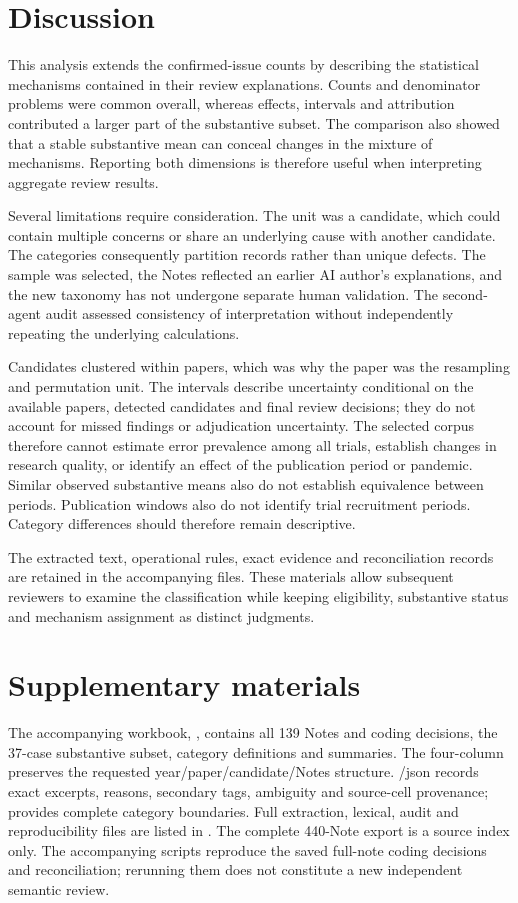 \documentclass[11pt,a4paper]{article}
\begin{document}
\section{Discussion}
This analysis extends the confirmed-issue counts by describing the statistical mechanisms contained in their review explanations. Counts and denominator problems were common overall, whereas effects, intervals and attribution contributed a larger part of the substantive subset. The comparison also showed that a stable substantive mean can conceal changes in the mixture of mechanisms. Reporting both dimensions is therefore useful when interpreting aggregate review results.\par
Several limitations require consideration. The unit was a candidate, which could contain multiple concerns or share an underlying cause with another candidate. The categories consequently partition records rather than unique defects. The sample was selected, the Notes reflected an earlier AI author's explanations, and the new taxonomy has not undergone separate human validation. The second-agent audit assessed consistency of interpretation without independently repeating the underlying calculations.\par
Candidates clustered within papers, which was why the paper was the resampling and permutation unit. The intervals describe uncertainty conditional on the available papers, detected candidates and final review decisions; they do not account for missed findings or adjudication uncertainty. The selected corpus therefore cannot estimate error prevalence among all trials, establish changes in research quality, or identify an effect of the publication period or pandemic. Similar observed substantive means also do not establish equivalence between periods. Publication windows also do not identify trial recruitment periods. Category differences should therefore remain descriptive.\par
The extracted text, operational rules, exact evidence and reconciliation records are retained in the accompanying files. These materials allow subsequent reviewers to examine the classification while keeping eligibility, substantive status and mechanism assignment as distinct judgments.\par
\section*{Supplementary materials}
The accompanying workbook, , contains all 139 Notes and coding decisions, the 37-case substantive subset, category definitions and summaries. The four-column  preserves the requested year/paper/candidate/Notes structure. /json records exact excerpts, reasons, secondary tags, ambiguity and source-cell provenance;  provides complete category boundaries. Full extraction, lexical, audit and reproducibility files are listed in . The complete 440-Note export is a source index only. The accompanying scripts reproduce the saved full-note coding decisions and reconciliation; rerunning them does not constitute a new independent semantic review.\par
\end{document}
